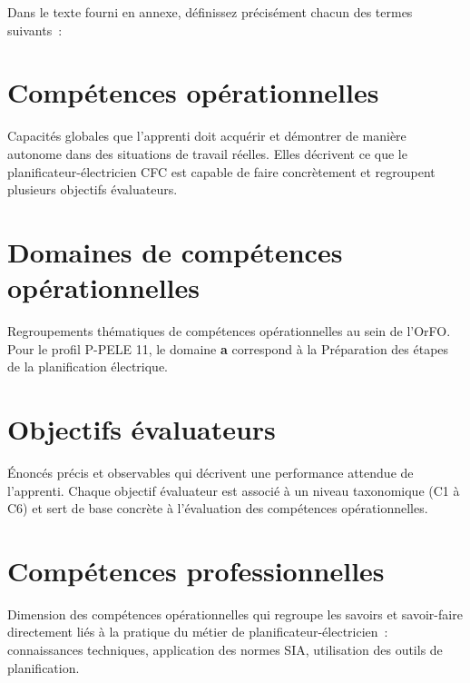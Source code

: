 \documentclass[a4paper,12pt,answers,addpoints]{exam}
\begin{document}
	\begin{questions}
		
		
		Dans le texte fourni en annexe, définissez précisément chacun des termes suivants~:
		
		\begin{parts}
			
			\part[1]{Compétences opérationnelles}
			\begin{solution}
				Capacités globales que l'apprenti doit acquérir et démontrer de manière autonome dans des situations de travail réelles. Elles décrivent ce que le planificateur-électricien CFC est capable de faire concrètement et regroupent plusieurs objectifs évaluateurs.
			\end{solution}
			
			\part[1]{Domaines de compétences opérationnelles}
			\begin{solution}
				Regroupements thématiques de compétences opérationnelles au sein de l'OrFO. Pour le profil P-PELE 11, le domaine \textbf{a} correspond à la  Préparation des étapes de la planification électrique.
			\end{solution}
			
			\part[1]{Objectifs évaluateurs}
			\begin{solution}
				Énoncés précis et observables qui décrivent une performance attendue de l'apprenti. Chaque objectif évaluateur est associé à un niveau taxonomique (C1 à C6) et sert de base concrète à l'évaluation des compétences opérationnelles.
			\end{solution}
			
			\part[1]{Compétences professionnelles}
			\begin{solution}
				Dimension des compétences opérationnelles qui regroupe les savoirs et savoir-faire directement liés à la pratique du métier de planificateur-électricien~: connaissances techniques, application des normes SIA, utilisation des outils de planification.
			\end{solution}
			

\end{parts}
\end{questions}
\end{document}
